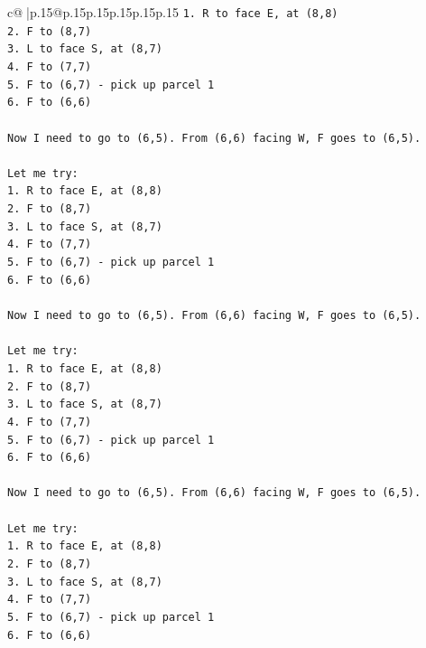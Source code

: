 \documentclass{article}
\begin{document}
{\begin{supertabular}{c@{$\;$}|p{.15\linewidth}@{}p{.15\linewidth}p{.15\linewidth}p{.15\linewidth}p{.15\linewidth}p{.15\linewidth}}
{{{\texttt{1. R to face E, at (8,8)} \\
\texttt{2. F to (8,7)} \\
\texttt{3. L to face S, at (8,7)} \\
\texttt{4. F to (7,7)} \\
\texttt{5. F to (6,7) {-} pick up parcel 1} \\
\texttt{6. F to (6,6)} \\
\\ 
\texttt{Now I need to go to (6,5). From (6,6) facing W, F goes to (6,5).} \\
\\ 
\texttt{Let me try:} \\
\texttt{1. R to face E, at (8,8)} \\
\texttt{2. F to (8,7)} \\
\texttt{3. L to face S, at (8,7)} \\
\texttt{4. F to (7,7)} \\
\texttt{5. F to (6,7) {-} pick up parcel 1} \\
\texttt{6. F to (6,6)} \\
\\ 
\texttt{Now I need to go to (6,5). From (6,6) facing W, F goes to (6,5).} \\
\\ 
\texttt{Let me try:} \\
\texttt{1. R to face E, at (8,8)} \\
\texttt{2. F to (8,7)} \\
\texttt{3. L to face S, at (8,7)} \\
\texttt{4. F to (7,7)} \\
\texttt{5. F to (6,7) {-} pick up parcel 1} \\
\texttt{6. F to (6,6)} \\
\\ 
\texttt{Now I need to go to (6,5). From (6,6) facing W, F goes to (6,5).} \\
\\ 
\texttt{Let me try:} \\
\texttt{1. R to face E, at (8,8)} \\
\texttt{2. F to (8,7)} \\
\texttt{3. L to face S, at (8,7)} \\
\texttt{4. F to (7,7)} \\
\texttt{5. F to (6,7) {-} pick up parcel 1} \\
\texttt{6. F to (6,6)} \\
\\ 
}}}
\end{supertabular}}
\end{document}
